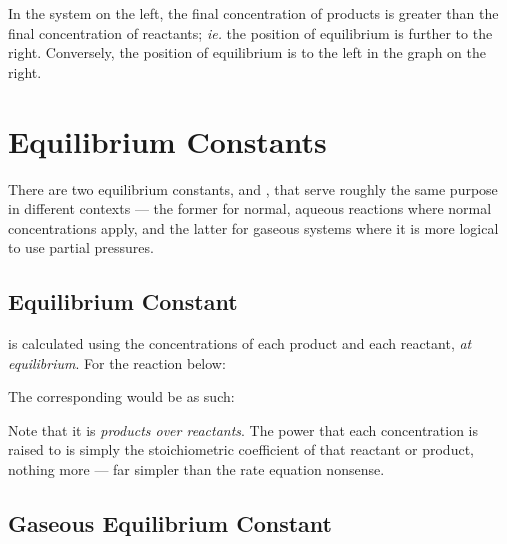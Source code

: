 				In the system on the left, the final concentration of products is greater than the final concentration of reactants;
				\textit{ie.} the position of equilibrium is further to the right. Conversely, the position of equilibrium is to the left
				in the graph on the right.





	\pagebreak
	\section{Equilibrium Constants}

		There are two equilibrium constants, \Kc and \Kp, that serve roughly the same purpose in different contexts --- the former for normal,
		aqueous reactions where normal concentrations apply, and the latter for gaseous systems where it is more logical to use partial pressures.

		\subsection{Equilibrium Constant \MKc}

			\Kc is calculated using the concentrations of each product and each reactant, \textit{at equilibrium}. For the reaction below:


			The corresponding \Kc would be as such:


			Note that it is \textit{products over reactants}. The power that each concentration is raised to is simply the stoichiometric
			coefficient of that reactant or product, nothing more --- far simpler than the rate equation nonsense.



		\subsection{Gaseous Equilibrium Constant \MKp}

